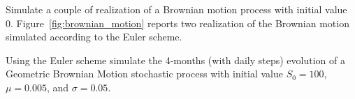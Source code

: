 \documentclass[12pt,a4paper]{book}
\begin{document}
%
%

\begin{exercise}[subtitle={Brownian Motion (\texttt{python})}]
Simulate a couple of realization of a Brownian motion process with initial value 0.
Figure~\ref{fig:brownian_motion} reports two realization of the Brownian motion simulated according to the Euler scheme.
\end{exercise}

\begin{exercise}[subtitle={Geometric Brownian Motion  (\texttt{python})}]
Using the Euler scheme simulate the 4-months (with daily steps) evolution of a Geometric Brownian Motion stochastic process with initial value $S_0=100$, $\mu=0.005$, and $\sigma=0.05$.
\end{exercise}
\end{document}
